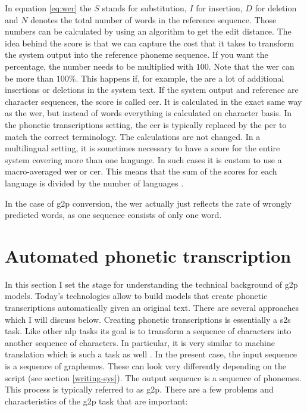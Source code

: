 In equation \ref{eq:wer} the $S$ stands for substitution, $I$ for insertion, $D$ for deletion and $N$ denotes the total number of words in the reference sequence. Those numbers can be calculated by using an algorithm to get the edit distance. The idea behind the score is that we can capture the cost that it takes to transform the system output into the reference phoneme sequence. If you want the percentage, the number needs to be multiplied with $100$. Note that the \ac{wer} can be more than $100$\%. This happens if, for example, the are a lot of additional insertions or deletions in the system text. If the system output and reference are character sequences, the score is called \acf{cer}. It is calculated in the exact same way as the \ac{wer}, but instead of words everything is calculated on character basis. In the phonetic transcriptions setting, the \ac{cer} is typically replaced by the \acf{per} to match the correct terminology. The calculations are not changed. In a multilingual setting, it is sometimes necessary to have a score for the entire system covering more than one language. In such cases it is custom to use a macro-averaged \ac{wer} or \ac{cer}. This means that the sum of the scores for each language is divided by the number of languages \citep{Leung.2021}.

In the case of \ac{g2p} conversion, the \ac{wer} actually just reflects the rate of wrongly predicted words, as one sequence consists of only one word. 


\section{Automated phonetic transcription}
\label{model_theory}
In this section I set the stage for understanding the technical background of \ac{g2p} models. Today's technologies allow to build models that create phonetic transcriptions automatically given an original text. There are several approaches which I will discuss below. Creating phonetic transcriptions is essentially a \acf{s2s} task. Like other \ac{nlp} tasks its goal is to transform a sequence of characters into another sequence of characters. In particular, it is very similar to machine translation which is such a task as well \citep{Rao2015GraphemetophonemeCU}. In the present case, the input sequence is a sequence of graphemes. These can look very differently depending on the script (see section \ref{writing-sys}). The output sequence is a sequence of phonemes. This process is typically referred to as \ac{g2p}. There are a few problems and characteristics of the \ac{g2p} task that are important:

